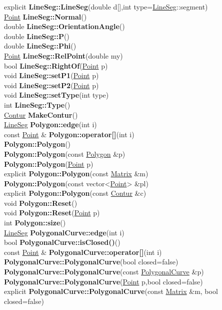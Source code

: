 \documentclass[10pt,titlepage]{article}
\def\functionlistentry#1#2#3#4#5#6{\noindent #1 {\bf #2}(#3) \dotfill #6\\}
\begin{document}
{{\functionlistentry{explicit}{LineSeg::LineSeg}{double d[],int type=\hyperlink{LineSeg}{LineSeg}::segment}{557}{geoObject}{}
\functionlistentry{\hyperlink{Point}{Point}}{LineSeg::Normal}{}{579}{geoObject}{}
\functionlistentry{double}{LineSeg::OrientationAngle}{}{569}{geoObject}{}
\functionlistentry{double}{LineSeg::P}{}{567}{geoObject}{}
\functionlistentry{double}{LineSeg::Phi}{}{568}{geoObject}{}
\functionlistentry{\hyperlink{Point}{Point}}{LineSeg::RelPoint}{double my}{564}{geoObject}{}
\functionlistentry{bool}{LineSeg::RightOf}{\hyperlink{Point}{Point} p}{571}{geoObject}{}
\functionlistentry{void}{LineSeg::setP1}{\hyperlink{Point}{Point} p}{560}{geoObject}{}
\functionlistentry{void}{LineSeg::setP2}{\hyperlink{Point}{Point} p}{561}{geoObject}{}
\functionlistentry{void}{LineSeg::setType}{int type}{563}{geoObject}{}
\functionlistentry{int}{LineSeg::Type}{}{562}{geoObject}{}
\functionlistentry{\hyperlink{Contur}{Contur}}{MakeContur}{}{604}{geoObject}{}
\functionlistentry{\hyperlink{LineSeg}{LineSeg}}{Polygon::edge}{int i}{619}{geoObject}{}
\functionlistentry{const \hyperlink{Point}{Point} \&}{Polygon::operator[]}{int i}{618}{geoObject}{}
\functionlistentry{}{Polygon::Polygon}{}{611}{geoObject}{}
\functionlistentry{}{Polygon::Polygon}{const \hyperlink{Polygon}{Polygon} \&p}{612}{geoObject}{}
\functionlistentry{}{Polygon::Polygon}{\hyperlink{Point}{Point} p}{613}{geoObject}{}
\functionlistentry{explicit}{Polygon::Polygon}{const \hyperlink{Matrix}{Matrix} \&m}{614}{geoObject}{}
\functionlistentry{}{Polygon::Polygon}{const vector<\hyperlink{Point}{Point}> \&pl}{615}{geoObject}{}
\functionlistentry{explicit}{Polygon::Polygon}{const \hyperlink{Contur}{Contur} \&c}{616}{geoObject}{}
\functionlistentry{void}{Polygon::Reset}{}{621}{geoObject}{}
\functionlistentry{void}{Polygon::Reset}{\hyperlink{Point}{Point} p}{622}{geoObject}{}
\functionlistentry{int}{Polygon::size}{}{617}{geoObject}{}
\functionlistentry{\hyperlink{LineSeg}{LineSeg}}{PolygonalCurve::edge}{int i}{600}{geoObject}{}
\functionlistentry{bool}{PolygonalCurve::isClosed()}{}{598}{geoObject}{}
\functionlistentry{const \hyperlink{Point}{Point} \&}{PolygonalCurve::operator[]}{int i}{599}{geoObject}{}
\functionlistentry{}{PolygonalCurve::PolygonalCurve}{bool closed=false}{591}{geoObject}{}
\functionlistentry{}{PolygonalCurve::PolygonalCurve}{const \hyperlink{PolygonalCurve}{PolygonalCurve} \&p}{592}{geoObject}{}
\functionlistentry{}{PolygonalCurve::PolygonalCurve}{\hyperlink{Point}{Point} p,bool closed=false}{593}{geoObject}{}
\functionlistentry{explicit}{PolygonalCurve::PolygonalCurve}{const \hyperlink{Matrix}{Matrix} \&m, bool closed=false}{594}{geoObject}{}
}}
\end{document}
